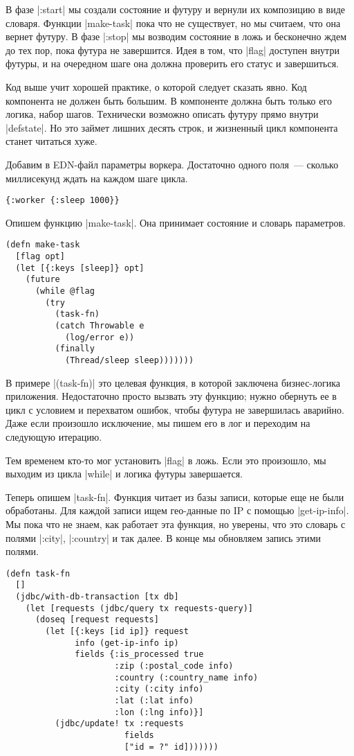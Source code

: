 В фазе \spverb|:start| мы создали состояние и футуру и вернули их композицию в виде
словаря. Функции \spverb|make-task| пока что не существует, но мы считаем, что она
вернет футуру. В фазе \spverb|:stop| мы возводим состояние в ложь и бесконечно ждем до
тех пор, пока футура не завершится. Идея в том, что \spverb|flag| доступен внутри
футуры, и на очередном шаге она должна проверить его статус и завершиться.

Код выше учит хорошей практике, о которой следует сказать явно. Код компонента
не должен быть большим. В компоненте должна быть только его логика, набор
шагов. Технически возможно описать футуру прямо внутри \spverb|defstate|. Но это займет
лишних десять строк, и жизненный цикл компонента станет читаться хуже.

Добавим в EDN-файл параметры воркера. Достаточно одного поля~--- сколько
миллисекунд ждать на каждом шаге цикла.

\begin{verbatim}
{:worker {:sleep 1000}}
\end{verbatim}

Опишем функцию \spverb|make-task|. Она принимает состояние и словарь параметров.

\begin{verbatim}
(defn make-task
  [flag opt]
  (let [{:keys [sleep]} opt]
    (future
      (while @flag
        (try
          (task-fn)
          (catch Throwable e
            (log/error e))
          (finally
            (Thread/sleep sleep)))))))
\end{verbatim}

В примере \spverb|(task-fn)| это целевая функция, в которой заключена бизнес-логика
приложения. Недостаточно просто вызвать эту функцию; нужно обернуть ее в цикл с
условием и перехватом ошибок, чтобы футура не завершилась аварийно. Даже если
произошло исключение, мы пишем его в лог и переходим на следующую итерацию.

Тем временем кто-то мог установить \spverb|flag| в ложь. Если это произошло, мы выходим
из цикла \spverb|while| и логика футуры завершается.

Теперь опишем \spverb|task-fn|. Функция читает из базы записи, которые еще не были
обработаны. Для каждой записи ищем гео-данные по IP с помощью \spverb|get-ip-info|. Мы
пока что не знаем, как работает эта функция, но уверены, что это словарь с
полями \spverb|:city|, \spverb|:country| и так далее. В конце мы обновляем запись этими
полями.

\begin{verbatim}
(defn task-fn
  []
  (jdbc/with-db-transaction [tx db]
    (let [requests (jdbc/query tx requests-query)]
      (doseq [request requests]
        (let [{:keys [id ip]} request
              info (get-ip-info ip)
              fields {:is_processed true
                      :zip (:postal_code info)
                      :country (:country_name info)
                      :city (:city info)
                      :lat (:lat info)
                      :lon (:lng info)}]
          (jdbc/update! tx :requests
                        fields
                        ["id = ?" id]))))))
\end{verbatim}

